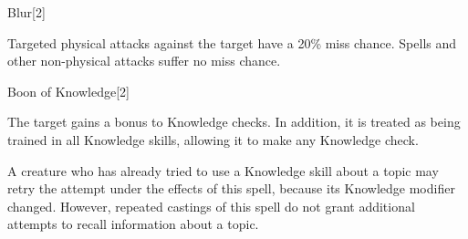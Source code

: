 \begin{spellsection}{Blur}[2]
    \begin{spellheader}
    \end{spellheader}
    \begin{spellcontent}
        \begin{spelltargetinginfo}
        \end{spelltargetinginfo}
        \begin{spelleffects}
            \spelleffect Targeted physical attacks against the target have a 20\% miss chance.
            Spells and other non-physical attacks suffer no miss chance.
            \spelldur \durshort
        \end{spelleffects}
    \end{spellcontent}
    \begin{spellfooter}
        \miscastrandom
    \end{spellfooter}
\end{spellsection}

\begin{spellsection}{Boon of Knowledge}[2]
    \begin{spellheader}
    \end{spellheader}
    \begin{spellcontent}
        \begin{spelltargetinginfo}
        \end{spelltargetinginfo}
        \begin{spelleffects}
            \spelleffect The target gains a  bonus to Knowledge checks.
            In addition, it is treated as being trained in all Knowledge skills, allowing it to make any Knowledge check.
            \spelldur \durshort
        \end{spelleffects}
    \end{spellcontent}
    \begin{spellfooter}
        \spellnotes A creature who has already tried to use a Knowledge skill about a topic may retry the attempt under the effects of this spell, because its Knowledge modifier changed.
        However, repeated castings of this spell do not grant additional attempts to recall information about a topic.
        \miscastrandom
    \end{spellfooter}
\end{spellsection}

